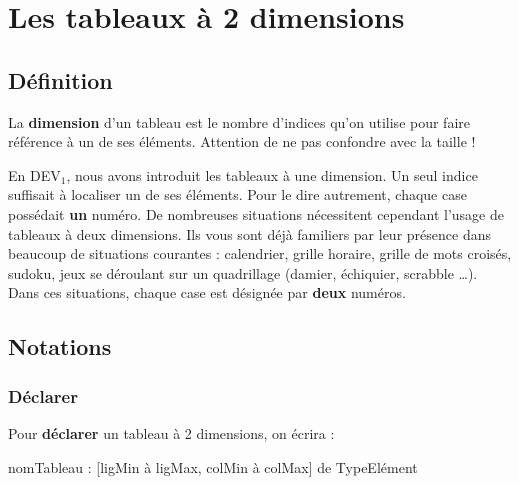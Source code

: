 \chapter{Les tableaux à 2 dimensions}

\section{Définition}

	La \textbf{dimension} d’un tableau est le nombre d’indices qu’on utilise
	pour faire référence à un de ses éléments. Attention de ne pas confondre 
	avec la	taille !
	
	En DEV$_1$, nous avons introduit les tableaux à une dimension.
	Un seul indice suffisait à localiser un de ses éléments. 
	Pour le dire autrement,
	chaque case possédait \textbf{un} numéro.
	De nombreuses situations nécessitent cependant l’usage de tableaux à deux dimensions.
	Ils vous sont déjà familiers par leur présence dans beaucoup de
	situations courantes : calendrier, grille horaire, grille de mots
	croisés, sudoku, jeux se déroulant sur un quadrillage (damier,
	échiquier, scrabble \dots).
	Dans ces situations, 
	chaque case est désignée par \textbf{deux} numéros.

\section{Notations}

\subsection{Déclarer}
	
	Pour \textbf{déclarer} un tableau à 2 dimensions, on écrira :

	\begin{Pseudocode}
	\Decl nomTableau :  [ligMin à ligMax, colMin à colMax] de TypeElément
	\end{Pseudocode}

	

